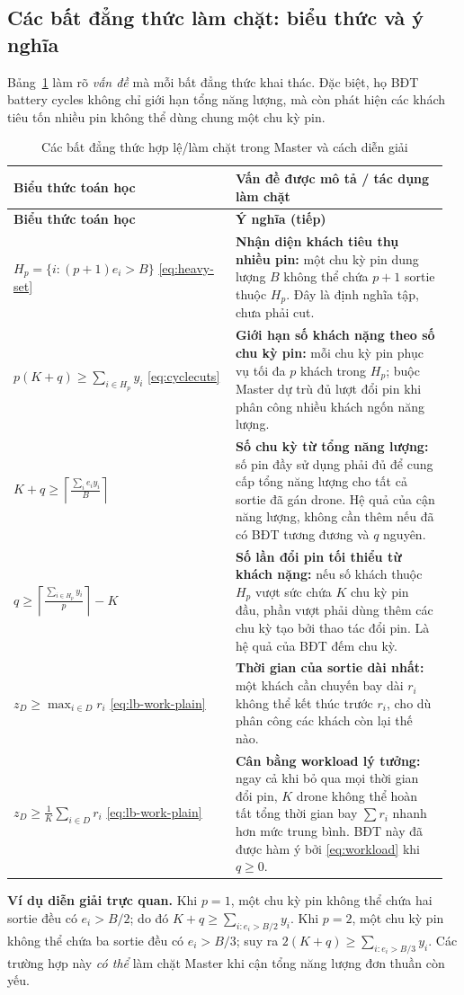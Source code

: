 \documentclass[11pt,a4paper]{article}
\theoremstyle{definition}
\theoremstyle{plain}
\theoremstyle{remark}
\begin{document}
\subsection{Các bất đẳng thức làm chặt: biểu thức và ý nghĩa}
\label{subsec:strength-meaning}
Bảng~\ref{tab:strength-meaning} làm rõ \emph{vấn đề} mà mỗi bất đẳng thức khai thác. Đặc biệt, họ BĐT battery cycles không chỉ giới hạn tổng năng lượng, mà còn phát hiện các khách tiêu tốn nhiều pin không thể dùng chung một chu kỳ pin.
\begingroup
\small\renewcommand{\arraystretch}{1.37}
\begin{longtable}{@{}p{0.49\linewidth}p{0.47\linewidth}@{}}
\caption{Các bất đẳng thức hợp lệ/làm chặt trong Master và cách diễn giải}\label{tab:strength-meaning}\\
\toprule
\textbf{Biểu thức toán học} & \textbf{Vấn đề được mô tả / tác dụng làm chặt}\\\midrule
\endfirsthead
\toprule
\textbf{Biểu thức toán học} & \textbf{Ý nghĩa (tiếp)}\\\midrule
\endhead
\bottomrule
\endfoot
$\displaystyle H_p=\{i:(p+1)e_i>B\}$ \eqref{eq:heavy-set}
& \textbf{Nhận diện khách tiêu thụ nhiều pin:} một chu kỳ pin dung lượng $B$ không thể chứa $p+1$ sortie thuộc $H_p$. Đây là định nghĩa tập, chưa phải cut.\\
$\displaystyle p(K+q)\ge\sum_{i\in H_p}y_i$ \eqref{eq:cyclecuts}
& \textbf{Giới hạn số khách nặng theo số chu kỳ pin:} mỗi chu kỳ pin phục vụ tối đa $p$ khách trong $H_p$; buộc Master dự trù đủ lượt đổi pin khi phân công nhiều khách ngốn năng lượng.\\
$\displaystyle K+q\ge\left\lceil\frac{\sum_i e_i y_i}{B}\right\rceil$
& \textbf{Số chu kỳ từ tổng năng lượng:} số pin đầy sử dụng phải đủ để cung cấp tổng năng lượng cho tất cả sortie đã gán drone. Hệ quả của cận năng lượng, không cần thêm nếu đã có BĐT tương đương và $q$ nguyên.\\
$\displaystyle q\ge \left\lceil\frac{\sum_{i\in H_p} y_i}{p}\right\rceil-K$
& \textbf{Số lần đổi pin tối thiểu từ khách nặng:} nếu số khách thuộc $H_p$ vượt sức chứa $K$ chu kỳ pin đầu, phần vượt phải dùng thêm các chu kỳ tạo bởi thao tác đổi pin. Là hệ quả của BĐT đếm chu kỳ.\\
$\displaystyle z_D\ge\max_{i\in D}r_i$ \eqref{eq:lb-work-plain}
& \textbf{Thời gian của sortie dài nhất:} một khách cần chuyến bay dài $r_i$ không thể kết thúc trước $r_i$, cho dù phân công các khách còn lại thế nào.\\
$\displaystyle z_D\ge\frac{1}{K}\sum_{i\in D}r_i$ \eqref{eq:lb-work-plain}
& \textbf{Cân bằng workload lý tưởng:} ngay cả khi bỏ qua mọi thời gian đổi pin, $K$ drone không thể hoàn tất tổng thời gian bay $\sum r_i$ nhanh hơn mức trung bình. BĐT này đã được hàm ý bởi \eqref{eq:workload} khi $q\ge0$.\\
\end{longtable}
\endgroup
\noindent\textbf{Ví dụ diễn giải trực quan.} Khi $p=1$, một chu kỳ pin không thể chứa hai sortie đều có $e_i>B/2$; do đó $K+q\ge\sum_{i:e_i>B/2}y_i$. Khi $p=2$, một chu kỳ pin không thể chứa ba sortie đều có $e_i>B/3$; suy ra $2(K+q)\ge\sum_{i:e_i>B/3}y_i$. Các trường hợp này \emph{có thể} làm chặt Master khi cận tổng năng lượng đơn thuần còn yếu.
\end{document}
